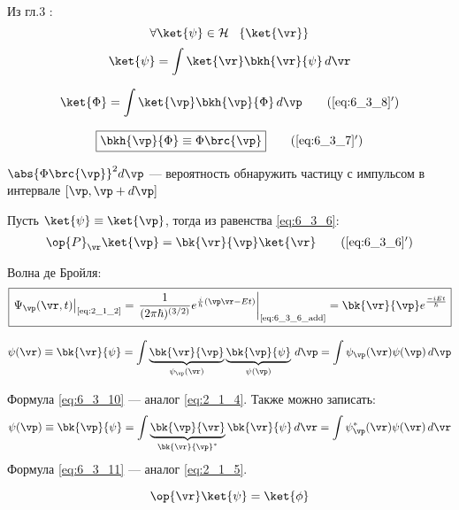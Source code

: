 Из гл.3 :
$$
\forall \ket{\psi} \in \mathcal{H} ~~ \left\{ \ket{\vr} \right\}
$$
\begin{equation}
\label{eq:6_3_8}
\ket{\psi}=\int \ket{\vr}\bkh{\vr}{\psi} \, d\vr
\end{equation}

\begin{equation}
\label{eq:6_3_8_add}
\ket{\Phi}=\int \ket{\vp}\bkh{\vp}{\Phi} \, d\vp
\tag{\ref{eq:6_3_8}$'$}
\end{equation}

\begin{equation}
\label{eq:6_3_7_add}
\boxed{\bkh{\vp}{\Phi} \equiv \Phi\brc{\vp}}
\tag{\ref{eq:6_3_7}$'$}
\end{equation}

$\abs{\Phi\brc{\vp}}^2 d\vp$ --- вероятность обнаружить частицу с импульсом в интервале $[\vp, \vp+d\vp]$

Пусть $\ket{\psi}\equiv\ket{\vp}$, тогда из равенства \eqref{eq:6_3_6}:
\begin{equation}
\label{eq:6_3_6_add}
\op{P}_{\vr}\ket{\vp}=\bk{\vr}{\vp}\ket{\vr}
\tag{\ref{eq:6_3_6}$'$}
\end{equation}

Волна де Бройля:
\begin{equation}
\label{eq:6_3_9}
\boxed{
	\left. \Psi_{\vp}(\vr,t) \right|_{\text{\eqref{eq:2_1_2}}} = 
	\left. \frac{1}{(2\pi \hbar)^{(3/2)}} e^{\frac{i}{h} (\vp\vr-Et)}  \right|_{\text{\eqref{eq:6_3_6_add}}} = 
	\bk{\vr}{\vp} e^\frac{-iEt}{\hbar}
}
\end{equation}

\begin{equation}
\label{eq:6_3_10}
\psi(\vr) \equiv \bk{\vr}{\psi} = 
\int \underbrace{  \bk{\vr}{\vp}  }_ {\psi_{\vp}(\vr)}  \underbrace{ \bk{\vp}{\psi} }_{\psi(\vp)} \, d\vp =
\int \psi_{\vp}(\vr) \psi(\vp) \, d\vp
\end{equation}

Формула \eqref{eq:6_3_10} --- аналог \eqref{eq:2_1_4}. Также можно записать:
\begin{equation}
\label{eq:6_3_11}
\psi(\vp) \equiv \bk{\vp}{\psi} = 
\int \underbrace{  \bk{\vp}{\vr}  }_ {\bk{\vr}{\vp}^*} \bk{\vr}{\psi} \, d\vr =
\int \psi^*_{\vp}(\vr) \psi(\vr) \, d\vr
\end{equation}
Формула \eqref{eq:6_3_11} --- аналог \eqref{eq:2_1_5}. 

\begin{equation}
\label{eq:6_3_12}
\op{\vr} \ket{\psi} = \ket{\phi}
\end{equation}


